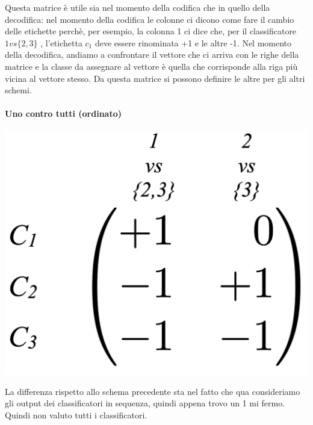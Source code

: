 Questa matrice è utile sia nel momento della codifica che in quello della decodifica: nel momento della codifica le colonne ci dicono come fare il cambio delle etichette perchè, per esempio, la colonna 1 ci dice che, per il classificatore $1vs\{2,3\}$ , l'etichetta $c_1$ deve essere rinominata +1 e le altre -1.
Nel momento della decodifica, andiamo a confrontare il vettore che ci arriva con le righe della matrice e la classe da assegnare al vettore è quella che corrisponde alla riga più vicina al vettore stesso.
Da questa matrice si possono definire le altre per gli altri schemi.
\newpage

\paragraph{Uno contro tutti (ordinato)}
\begin{center}
    \includegraphics[scale=0.4]{images/matrixOrd.png}    
\end{center}

La differenza rispetto allo schema precedente sta nel fatto che qua consideriamo gli output dei classificatori in sequenza, quindi appena trovo un 1 mi fermo. Quindi non valuto tutti i classificatori.

